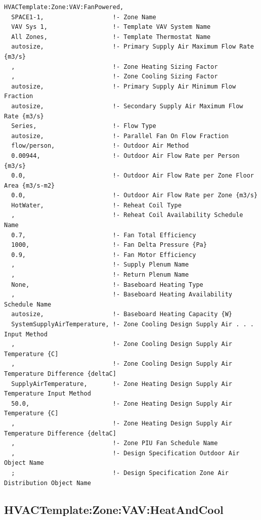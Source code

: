 \begin{lstlisting}
HVACTemplate:Zone:VAV:FanPowered,
  SPACE1-1,                   !- Zone Name
  VAV Sys 1,                  !- Template VAV System Name
  All Zones,                  !- Template Thermostat Name
  autosize,                   !- Primary Supply Air Maximum Flow Rate {m3/s}
  ,                           !- Zone Heating Sizing Factor
  ,                           !- Zone Cooling Sizing Factor
  autosize,                   !- Primary Supply Air Minimum Flow Fraction
  autosize,                   !- Secondary Supply Air Maximum Flow Rate {m3/s}
  Series,                     !- Flow Type
  autosize,                   !- Parallel Fan On Flow Fraction
  flow/person,                !- Outdoor Air Method
  0.00944,                    !- Outdoor Air Flow Rate per Person {m3/s}
  0.0,                        !- Outdoor Air Flow Rate per Zone Floor Area {m3/s-m2}
  0.0,                        !- Outdoor Air Flow Rate per Zone {m3/s}
  HotWater,                   !- Reheat Coil Type
  ,                           !- Reheat Coil Availability Schedule Name
  0.7,                        !- Fan Total Efficiency
  1000,                       !- Fan Delta Pressure {Pa}
  0.9,                        !- Fan Motor Efficiency
  ,                           !- Supply Plenum Name
  ,                           !- Return Plenum Name
  None,                       !- Baseboard Heating Type
  ,                           !- Baseboard Heating Availability Schedule Name
  autosize,                   !- Baseboard Heating Capacity {W}
  SystemSupplyAirTemperature, !- Zone Cooling Design Supply Air . . . Input Method
  ,                           !- Zone Cooling Design Supply Air Temperature {C]
  ,                           !- Zone Cooling Design Supply Air Temperature Difference {deltaC]
  SupplyAirTemperature,       !- Zone Heating Design Supply Air Temperature Input Method
  50.0,                       !- Zone Heating Design Supply Air Temperature {C]
  ,                           !- Zone Heating Design Supply Air Temperature Difference {deltaC]
  ,                           !- Zone PIU Fan Schedule Name
  ,                           !- Design Specification Outdoor Air Object Name
  ;                           !- Design Specification Zone Air Distribution Object Name
\end{lstlisting}

\subsection{HVACTemplate:Zone:VAV:HeatAndCool}\label{hvactemplatezonevavheatandcool}

